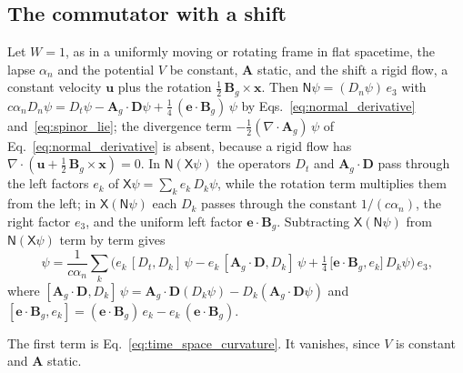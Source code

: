 \documentclass[aps,prd,onecolumn,tightenlines,nofootinbib,notitlepage,11pt,floatfix]{revtex4-2}
\theoremstyle{indentedtheorem}
\begin{document}
\subsection{The commutator with a shift}
\label{sup:master_shift}

Let $W=1$, as in a uniformly moving or rotating frame in flat spacetime, the lapse $\alpha_n$ and the potential $V$ be constant, $\mathbf{A}$ static, and the shift a rigid flow, a constant velocity $\mathbf{u}$ plus the rotation $\tfrac{1}{2}\,\mathbf{B}_g\times\mathbf{x}$. Then $\mathsf{N}\psi=(D_n\psi) \, e_3$ with $c\alpha_nD_n\psi=D_t\psi-\mathbf{A}_g\cdot\mathbf{D}\psi+\tfrac{1}{4} \, (\mathbf{e}\cdot\mathbf{B}_g) \, \psi$ by Eqs.~\eqref{eq:normal_derivative} and~\eqref{eq:spinor_lie}; the divergence term $-\tfrac{1}{2}(\nabla\cdot\mathbf{A}_g)\,\psi$ of Eq.~\eqref{eq:normal_derivative} is absent, because a rigid flow has $\nabla\cdot(\mathbf{u}+\tfrac{1}{2}\,\mathbf{B}_g\times\mathbf{x})=0$. In $\mathsf{N}(\mathsf{X}\psi)$ the operators $D_t$ and $\mathbf{A}_g\cdot\mathbf{D}$ pass through the left factors $e_k$ of $\mathsf{X}\psi=\sum_k e_k \, D_k\psi$, while the rotation term multiplies them from the left; in $\mathsf{X}(\mathsf{N}\psi)$ each $D_k$ passes through the constant $1/(c\alpha_n)$, the right factor $e_3$, and the uniform left factor $\mathbf{e}\cdot\mathbf{B}_g$. Subtracting $\mathsf{X}(\mathsf{N}\psi)$ from $\mathsf{N}(\mathsf{X}\psi)$ term by term gives
\begin{equation}
    [\mathsf{N},\mathsf{X}] \, \psi = \frac{1}{c\alpha_n} \sum_k \Big( e_k \, [D_t,D_k] \, \psi - e_k \, [\mathbf{A}_g\cdot\mathbf{D},D_k] \, \psi + \tfrac{1}{4} \, \big[\mathbf{e}\cdot\mathbf{B}_g, e_k\big] \, D_k\psi \Big) \, e_3 ,
    \label{eq:commutator_split}
\end{equation}
where $[\mathbf{A}_g\cdot\mathbf{D},D_k]\,\psi=\mathbf{A}_g\cdot\mathbf{D}(D_k\psi)-D_k(\mathbf{A}_g\cdot\mathbf{D}\psi)$ and $[\mathbf{e}\cdot\mathbf{B}_g,e_k]=(\mathbf{e}\cdot\mathbf{B}_g) \, e_k-e_k \, (\mathbf{e}\cdot\mathbf{B}_g)$.

The first term is Eq.~\eqref{eq:time_space_curvature}. It vanishes, since $V$ is constant and $\mathbf{A}$ static.
\end{document}
